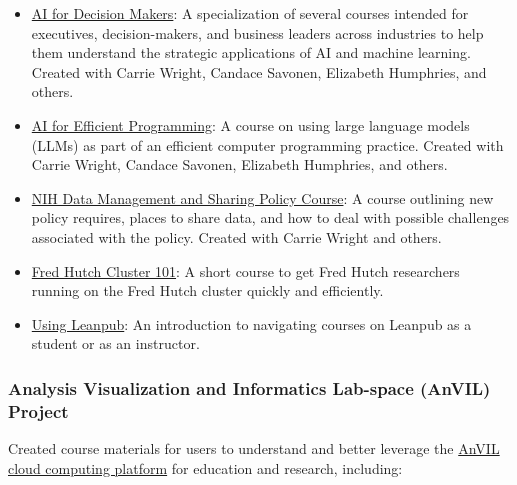 \documentclass{cv}
\begin{document}
\begin{itemize}

\item \href{https://hutchdatascience.org/AI_for_Decision_Makers/}{AI for Decision Makers}: A specialization of several courses intended for executives, decision-makers, and business leaders across industries to help them understand the strategic applications of AI and machine learning. Created with Carrie Wright, Candace Savonen, Elizabeth Humphries, and others.

\item \href{https://hutchdatascience.org/AI_for_Efficient_Programming/}{AI for Efficient Programming}: A course on using large language models (LLMs) as part of an efficient computer programming practice. Created with Carrie Wright, Candace Savonen, Elizabeth Humphries, and others.

\item \href{https://hutchdatascience.org/NIH_Data_Sharing/}{NIH Data Management and Sharing Policy Course}: A course outlining new policy requires, places to share data, and how to deal with possible challenges associated with the policy. Created with Carrie Wright and others.

\item \href{https://hutchdatascience.org/FH_Cluster_Guide/}{Fred Hutch Cluster 101}: A short course to get Fred Hutch researchers running on the Fred Hutch cluster quickly and efficiently.

\item \href{https://hutchdatascience.org/Using_Leanpub/}{Using Leanpub}: An introduction to navigating courses on Leanpub as a student or as an instructor.

\end{itemize}

\subsubsection*{Analysis Visualization and Informatics Lab-space (AnVIL) Project}

Created course materials for users to understand and better leverage the \href{https://anvilproject.org/}{AnVIL cloud computing platform} for education and research, including: 
\end{document}
